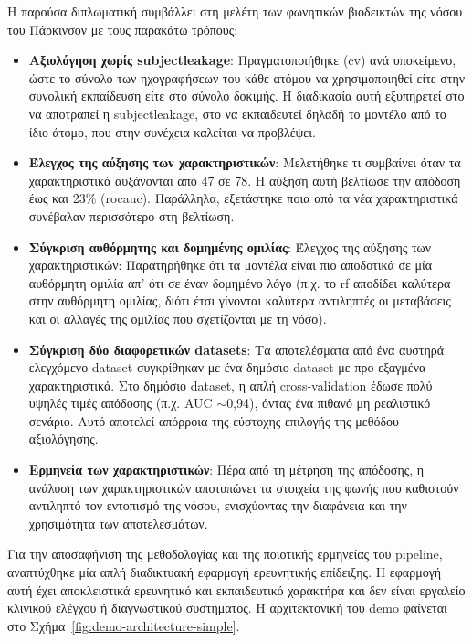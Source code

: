 Η παρούσα διπλωματική συμβάλλει στη μελέτη των φωνητικών βιοδεικτών της νόσου του Πάρκινσον με τους παρακάτω τρόπους:

\begin{itemize}
    \item \textbf{Αξιολόγηση χωρίς \gls{subjectleakage}}: Πραγματοποιήθηκε (\gls{cv}) ανά υποκείμενο, ώστε το σύνολο των ηχογραφήσεων του κάθε ατόμου να χρησιμοποιηθεί είτε στην συνολική εκπαίδευση είτε στο σύνολο δοκιμής. Η διαδικασία αυτή εξυπηρετεί στο να αποτραπεί η \gls{subjectleakage}, στο να εκπαιδευτεί δηλαδή το μοντέλο από το ίδιο άτομο, που στην συνέχεια καλείται να προβλέψει.
    \item \textbf{Έλεγχος της αύξησης των χαρακτηριστικών}: Μελετήθηκε τι συμβαίνει όταν τα χαρακτηριστικά αυξάνονται από 47 σε 78. Η αύξηση αυτή βελτίωσε την απόδοση έως και 23\% (\gls{rocauc}). Παράλληλα, εξετάστηκε ποια από τα νέα χαρακτηριστικά συνέβαλαν περισσότερο στη βελτίωση.
    \item \textbf{Σύγκριση αυθόρμητης και δομημένης ομιλίας}: Έλεγχος της αύξησης των χαρακτηριστικών: Παρατηρήθηκε ότι τα μοντέλα είναι πιο αποδοτικά σε μία αυθόρμητη ομιλία απ’ ότι σε έναν δομημένο λόγο (π.χ. το \gls{rf} αποδίδει καλύτερα στην αυθόρμητη ομιλίας, διότι έτσι γίνονται καλύτερα αντιληπτές οι μεταβάσεις και οι αλλαγές της ομιλίας που σχετίζονται με τη νόσο).
    \item \textbf{Σύγκριση δύο διαφορετικών datasets}: Τα αποτελέσματα από ένα αυστηρά ελεγχόμενο dataset συγκρίθηκαν με ένα δημόσιο dataset με προ-εξαγμένα χαρακτηριστικά. Στο δημόσιο dataset, η απλή cross-validation έδωσε πολύ υψηλές τιμές απόδοσης (π.χ. AUC $\sim$0,94), όντας ένα πιθανό μη ρεαλιστικό σενάριο. Αυτό αποτελεί απόρροια της εύστοχης επιλογής της μεθόδου αξιολόγησης.
    \item \textbf{Ερμηνεία των χαρακτηριστικών}: Πέρα από τη μέτρηση της απόδοσης, η ανάλυση των χαρακτηριστικών αποτυπώνει τα στοιχεία της φωνής που καθιστούν αντιληπτό τον εντοπισμό της νόσου, ενισχύοντας την διαφάνεια και την χρησιμότητα των αποτελεσμάτων.
\end{itemize}

Για την αποσαφήνιση της μεθοδολογίας και της ποιοτικής ερμηνείας του pipeline, αναπτύχθηκε μία απλή διαδικτυακή εφαρμογή ερευνητικής επίδειξης. Η εφαρμογή αυτή έχει αποκλειστικά ερευνητικό και εκπαιδευτικό χαρακτήρα και δεν είναι εργαλείο κλινικού ελέγχου ή διαγνωστικού συστήματος.
Η αρχιτεκτονική του demo φαίνεται στο Σχήμα~\ref{fig:demo-architecture-simple}.

